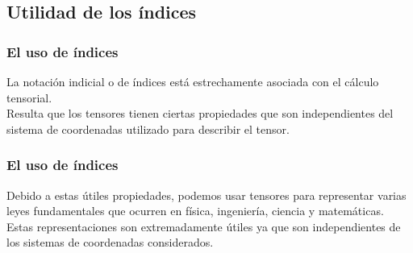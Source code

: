 \documentclass[12pt]{beamer}
\begin{document}
\subsection{Utilidad de los índices}
\begin{frame}
\frametitle{El uso de índices}
La notación indicial o de índices está estrechamente asociada con el cálculo tensorial.
\\
\bigskip
\pause
Resulta que los tensores tienen ciertas propiedades que son independientes del sistema de coordenadas utilizado para describir el tensor.
\end{frame}
\begin{frame}
\frametitle{El uso de índices}
Debido a estas útiles propiedades, podemos usar tensores para representar varias leyes fundamentales que ocurren en física, ingeniería, ciencia y matemáticas.
\\
\bigskip
\pause
Estas representaciones son extremadamente útiles ya que son independientes de los sistemas de coordenadas considerados.
\end{frame}
\end{document}
